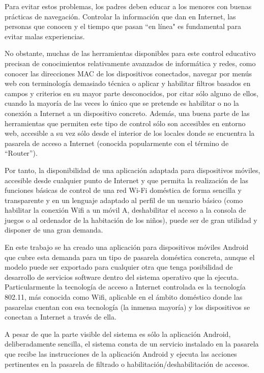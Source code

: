 \documentclass[12pt]{article}
\begin{document}
Para evitar estos problemas, los padres deben educar a los menores con buenas prácticas de navegación. Controlar la información que dan en Internet, las personas que conocen y el tiempo que pasan ``en línea" es fundamental para evitar malas experiencias.

No obstante, muchas de las herramientas disponibles para este control educativo precisan de conocimientos relativamente avanzados de informática y redes, como conocer las direcciones MAC de los dispositivos conectados, navegar por menús web con terminología demasiado técnica o aplicar y habilitar filtros basados en campos y criterios en su mayor parte desconocidos, por citar sólo alguno de ellos, cuando la mayoría de las veces lo único que se pretende es habilitar o no la conexión a Internet a un dispositivo concreto. Además, una buena parte de las herramientas que permiten este tipo de control sólo son accesibles en entorno web, accesible a su vez sólo desde el interior de los locales donde se encuentra la pasarela de acceso a Internet (conocida popularmente con el término de ``Router'').

Por tanto, la disponibilidad de una aplicación adaptada para dispositivos móviles, accesible desde cualquier punto de Internet y que permita la realización de las funciones básicas de control de una red Wi-Fi doméstica de forma sencilla y transparente y en un lenguaje adaptado al perfil de un usuario básico (como habilitar la conexión Wifi a un móvil A, deshabilitar el acceso a la consola de juegos o al ordenador de la habitación de los niños), puede ser de gran utilidad y disponer de una gran demanda.

En este trabajo se ha creado una aplicación para dispositivos móviles Android que cubre esta demanda para un tipo de pasarela doméstica concreta, aunque el modelo puede ser exportado para cualquier otra que tenga posibilidad de desarrollo de servicios software dentro del sistema operativo que la ejecuta. Particularmente la tecnología de acceso a Internet controlada es la tecnología 802.11, más conocida como Wifi, aplicable en el ámbito doméstico donde las pasarelas cuentan con esa tecnología (la inmensa mayoría) y los dispositivos se conectan a Internet a través de ella.

A pesar de que la parte visible del sistema es sólo la aplicación Android, deliberadamente sencilla, el sistema consta de un servicio instalado en la pasarela que recibe las instrucciones de la aplicación Android y ejecuta las acciones pertinentes en la pasarela de filtrado o habilitación/deshabilitación de accesos.
\end{document}
